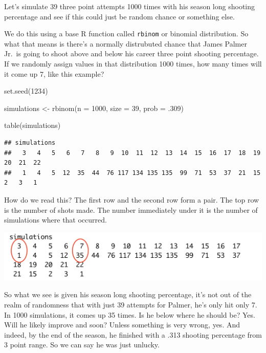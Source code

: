 \documentclass[
]{book}
\newenvironment{Shaded}{\begin{snugshade}}{\end{snugshade}}
\newcommand{\AttributeTok}[1]{\textcolor[rgb]{0.77,0.63,0.00}{#1}}
\newcommand{\DecValTok}[1]{\textcolor[rgb]{0.00,0.00,0.81}{#1}}
\newcommand{\FunctionTok}[1]{\textcolor[rgb]{0.00,0.00,0.00}{#1}}
\newcommand{\NormalTok}[1]{#1}
\newcommand{\OtherTok}[1]{\textcolor[rgb]{0.56,0.35,0.01}{#1}}
\begin{document}
Let's simulate 39 three point attempts 1000 times with his season long shooting percentage and see if this could just be random chance or something else.

We do this using a base R function called \texttt{rbinom} or binomial distribution. So what that means is there's a normally distrubuted chance that James Palmer Jr.~is going to shoot above and below his career three point shooting percentage. If we randomly assign values in that distribution 1000 times, how many times will it come up 7, like this example?

\begin{Shaded}
\begin{Highlighting}[]
\FunctionTok{set.seed}\NormalTok{(}\DecValTok{1234}\NormalTok{)}

\NormalTok{simulations }\OtherTok{\textless{}{-}} \FunctionTok{rbinom}\NormalTok{(}\AttributeTok{n =} \DecValTok{1000}\NormalTok{, }\AttributeTok{size =} \DecValTok{39}\NormalTok{, }\AttributeTok{prob =}\NormalTok{ .}\DecValTok{309}\NormalTok{)}

\FunctionTok{table}\NormalTok{(simulations)}
\end{Highlighting}
\end{Shaded}

\begin{verbatim}
## simulations
##   3   4   5   6   7   8   9  10  11  12  13  14  15  16  17  18  19  20  21  22 
##   1   4   5  12  35  44  76 117 134 135 135  99  71  53  37  21  15   2   3   1
\end{verbatim}

How do we read this? The first row and the second row form a pair. The top row is the number of shots made. The number immediately under it is the number of simulations where that occurred.

\includegraphics[width=23.06in]{images/simulations1}

So what we see is given his season long shooting percentage, it's not out of the realm of randomness that with just 39 attempts for Palmer, he's only hit only 7. In 1000 simulations, it comes up 35 times. Is he below where he should be? Yes. Will he likely improve and soon? Unless something is very wrong, yes. And indeed, by the end of the season, he finished with a .313 shooting percentage from 3 point range. So we can say he was just unlucky.
\end{document}

